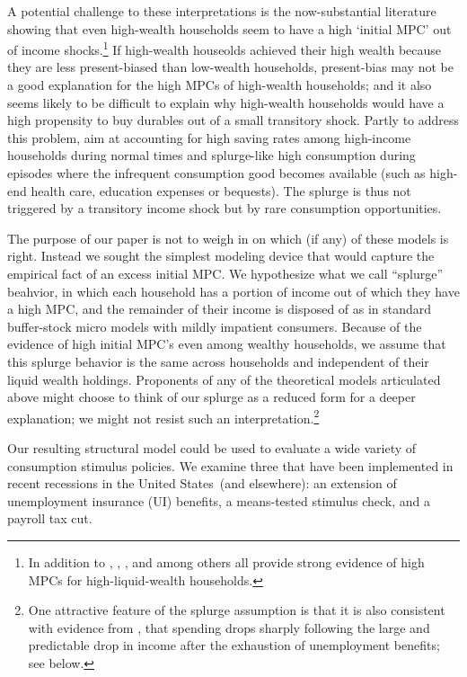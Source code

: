 \documentclass[\econtexRoot/HAFiscal]{subfiles}
\begin{document}
A potential challenge to these interpretations is the now-substantial literature showing that even high-wealth households seem to have a high `initial MPC' out of income shocks.\footnote{In addition to \cite{fagereng_mpc_2021}, \cite{graham2024mental}, \cite{crawley2023MicroMacro}, and \cite{kueng2018excess} among others all provide strong evidence of high MPCs for high-liquid-wealth households.}  If high-wealth houseolds achieved their high wealth because they are less present-biased than low-wealth households, present-bias may not be a good explanation for the high MPCs of high-wealth households; and it also seems likely to be difficult to explain why high-wealth households would have a high propensity to buy durables out of a small transitory shock.  Partly to address this problem, \citet{melcangiStock} aim at accounting for high saving rates among high-income households during normal times and splurge-like high consumption during episodes where the infrequent consumption good becomes available (such as high-end health care, education expenses or bequests).  The splurge is thus not triggered by a transitory income shock but by rare consumption opportunities.

The purpose of our paper is not to weigh in on which (if any) of these models is right.  Instead we sought the simplest modeling device that would capture the empirical fact of an excess initial MPC.  We hypothesize what we call ``splurge'' beahvior, in which each household has a portion of income out of which they have a high MPC, and the remainder of their income is disposed of as in standard buffer-stock micro models with mildly impatient consumers.  Because of the evidence of high initial MPC's even among wealthy households, we assume that this splurge behavior is the same across households and independent of their liquid wealth holdings. Proponents of any of the theoretical models articulated above might choose to think of our splurge as a reduced form for a deeper explanation; we might not resist such an interpretation.\footnote{One attractive feature of the splurge assumption is that it is also consistent with evidence from \cite{ganongConsumer2019}, that spending drops sharply following the large and predictable drop in income after the exhaustion of unemployment benefits; see below.}

Our resulting structural model could be used to evaluate a wide variety of consumption stimulus policies.  We examine three that have been implemented in recent recessions in the United States\ (and elsewhere): an extension of unemployment insurance (UI) benefits, a means-tested stimulus check, and a payroll tax cut.    
\end{document}
